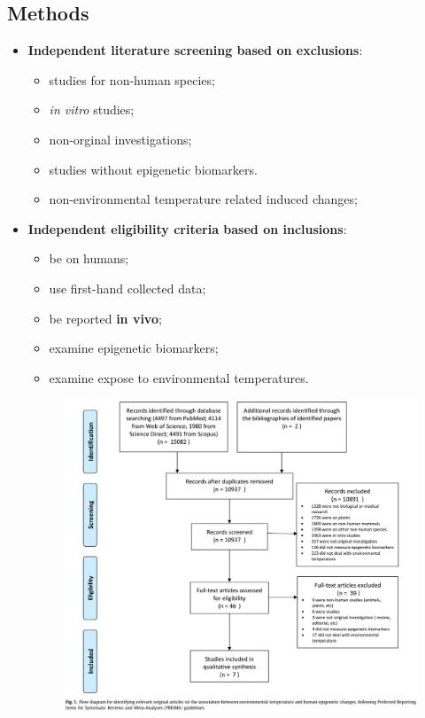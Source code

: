 \documentclass[basic]{inVerba-notes}
\begin{document}
\begin{itemize}
  \subsection{Methods}
  \begin{itemize}
  \item \textbf{Independent literature screening based on exclusions}:
  \begin{multicols}{2}
    \begin{itemize}
      \item studies for non-human species;
      \item \textit{in vitro} studies;
      \item non-orginal investigations;
      \item studies without epigenetic biomarkers.
      \item non-environmental temperature related induced changes;
    \end{itemize}
  \end{multicols}
  \item \textbf{Independent eligibility criteria based on inclusions}:
  \begin{multicols}{2}
    \begin{itemize}
      \item be on humans;
      \item use first-hand collected data;
      \item be reported \textbf{in vivo};
      \item examine epigenetic biomarkers;
      \item examine expose to environmental temperatures. 
    \end{itemize}
  \end{multicols}
  \begin{figure}[h]
    \centering
    \includegraphics[scale=0.33]{images/fig-4-1.png} %
  \end{figure}
\end{itemize}


\end{itemize}
\end{document}
